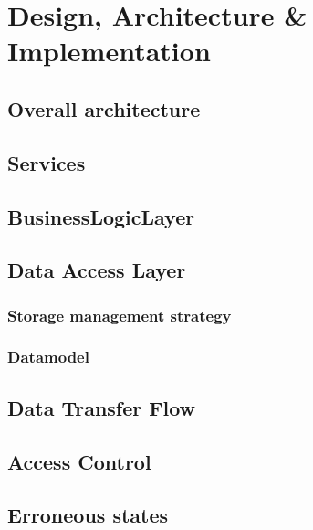 \documentclass{report}
\begin{document}
\chapter{Design, Architecture \& \\Implementation}

\section{Overall architecture}


\section{Services}


\section{BusinessLogicLayer}


\section{Data Access Layer}
\subsection{Storage management strategy}

\subsection{Datamodel}




\section{Data Transfer Flow}


% 

\section{Access Control}


\section{Erroneous states}

\end{document}
